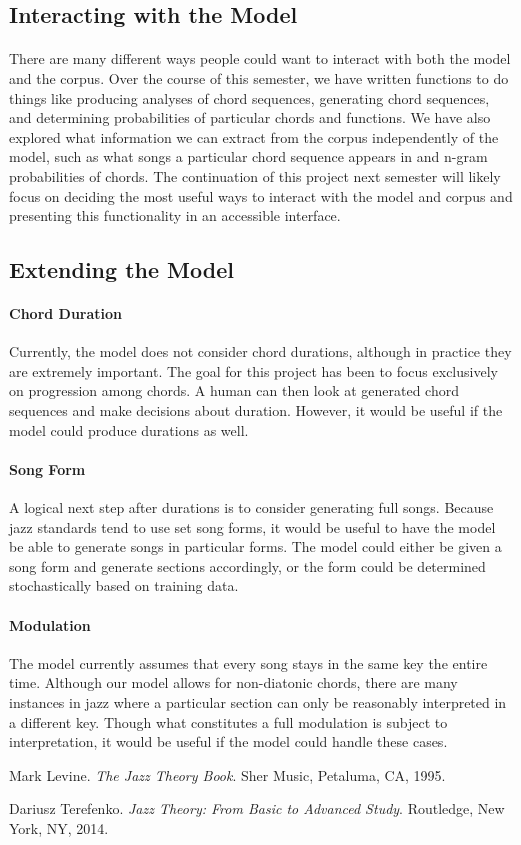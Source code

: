 \documentclass[]{article}
\begin{document}
\subsection{Interacting with the Model}
\paragraph{} There are many different ways people could want to interact with both the model and the corpus.  Over the course of this semester, we have written functions to do things like producing analyses of chord sequences, generating chord sequences, and determining probabilities of particular chords and functions.  We have also explored what information we can extract from the corpus independently of the model, such as what songs a particular chord sequence appears in and n-gram probabilities of chords.  The continuation of this project next semester will likely focus on deciding the most useful ways to interact with the model and corpus and presenting this functionality in an accessible interface.

\subsection{Extending the Model}
\paragraph{Chord Duration} Currently, the model does not consider chord durations, although in practice they are extremely important.  The goal for this project has been to focus exclusively on progression among chords.  A human can then look at generated chord sequences and make decisions about duration.  However, it would be useful if the model could produce durations as well.

\paragraph{Song Form} A logical next step after durations is to consider generating full songs.  Because jazz standards tend to use set song forms, it would be useful to have the model be able to generate songs in particular forms.  The model could either be given a song form and generate sections accordingly, or the form could be determined stochastically based on training data.

\paragraph{Modulation} The model currently assumes that every song stays in the same key the entire time.  Although our model allows for non-diatonic chords, there are many instances in jazz where a particular section can only be reasonably interpreted in a different key.  Though what constitutes a full modulation is subject to interpretation, it would be useful if the model could handle these cases.

\begin{thebibliography}{9}
	Mark Levine. \textit{The Jazz Theory Book}.  Sher Music, Petaluma, CA, 1995.
	
	Dariusz Terefenko.  \textit{Jazz Theory: From Basic to Advanced Study}.  Routledge, New York, NY, 2014.
\end{thebibliography}
\end{document}
